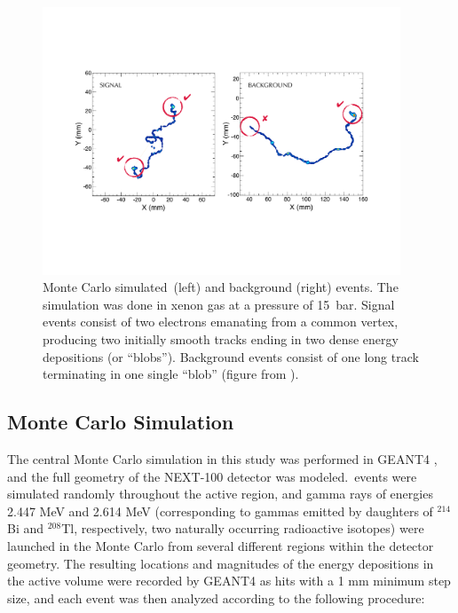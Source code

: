 \documentclass[a4paper,11pt]{article}
\begin{document}
\begin{figure}[!htb]
	\centering
	\includegraphics[width= 0.95\textwidth]{fig/TrackSignature.pdf}
	\caption{Monte Carlo simulated \bbonu\,(left) and background (right) events.  The simulation was done in xenon gas at a pressure of 15~bar. Signal events consist of two electrons emanating
		from a common vertex, producing two initially smooth tracks ending in two dense energy depositions (or ``blobs'').  Background events consist of one long track terminating in one
		single ``blob'' (figure from \cite{MartinAlbo_thesis}).} \label{fig.ETRK2}
\end{figure}

\subsection{Monte Carlo Simulation}\label{ssec:NEXT100MC}
The central Monte Carlo simulation in this study was performed in GEANT4 \cite{GEANT4}, and the full geometry of the NEXT-100 detector was modeled.  \bbonu\,events were
simulated randomly throughout the active region, and gamma rays of energies 2.447 MeV and 2.614 MeV (corresponding to gammas emitted by daughters of $^{214}$Bi and $^{208}$Tl,
respectively, two naturally occurring radioactive isotopes) were launched in the Monte Carlo from several different regions within the detector geometry. %
The resulting locations and magnitudes of the energy depositions in the active volume were recorded by GEANT4 as hits with a 1 mm minimum step size, and each event was then
analyzed according to the following procedure:
\end{document}
